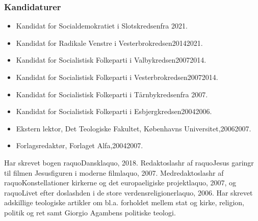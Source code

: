 \documentclass[11pt, a4paper]{awesome-cv}
\begin{document}
\begin{cvletter}
\subsubsection*{Kandidaturer}
\begin{itemize}
\item Kandidat for Socialdemokratiet i Slotskredsenfra 2021.
\item Kandidat for Radikale Venstre i Vesterbrokredsen20142021.
\item Kandidat for Socialistisk Folkeparti i Valbykredsen20072014.
\item Kandidat for Socialistisk Folkeparti i Vesterbrokredsen20072014.
\item Kandidat for Socialistisk Folkeparti i Tårnbykredsenfra 2007.
\item Kandidat for Socialistisk Folkeparti i Esbjergkredsen20042006.
\end{itemize}
\begin{itemize}
\item Ekstern lektor, Det Teologiske Fakultet, Københavns Universitet,20062007.
\item Forlagsredaktør, Forlaget Alfa,20042007.
\end{itemize}
Har skrevet bogen raquoDansklaquo, 2018. Redaktoslashr af raquoJesus garingr til filmen  Jesusfiguren i moderne filmlaquo, 2007. Medredaktoslashr af raquoKonstellationer  kirkerne og det europaeligiske projektlaquo, 2007, og raquoLivet efter doslashden  i de store verdensreligionerlaquo, 2006. Har skrevet adskillige teologiske artikler om bl.a. forholdet mellem stat og kirke, religion, politik og ret samt Giorgio Agambens politiske teologi.

\end{cvletter}
\end{document}
